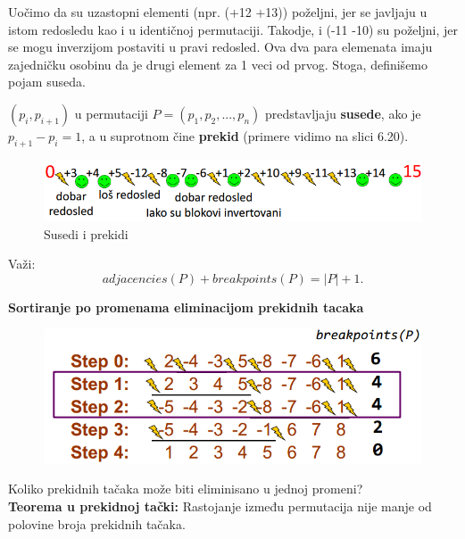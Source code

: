 \hspace{0.7cm}Uočimo da su uzastopni elementi (npr. (+12 +13)) poželjni, jer se javljaju u istom redosledu kao i u identičnoj permutaciji. Takodje, i (-11 -10) su poželjni, jer se mogu inverzijom postaviti u pravi redosled. Ova dva para elemenata imaju zajedničku osobinu da je drugi element za 1 veci od prvog. Stoga, definišemo pojam suseda.

\begin{definicija}{$(p_i, p_{i+1})$ u permutaciji $P = (p_1, p_2, ..., p_n)$ predstavljaju \textbf{susede}, ako je $p_{i+1} - p_i = 1$, a u suprotnom čine \textbf{prekid} (primere vidimo na slici 6.20).}
\end{definicija}

\begin{figure}[h!]
\centering
\includegraphics[scale=0.75]{poglavlja/6/slike/dobar_los.PNG}
\caption{Susedi i prekidi}
\label{slika:X}
\end{figure}

Važi:\\
$$ adjacencies(P) + breakpoints(P) = |P| + 1.$$

\hspace{1cm}

\large{\textbf{Sortiranje po promenama eliminacijom prekidnih tacaka}}\\

\begin{figure}[h]
\centering
\includegraphics[scale=0.7]{poglavlja/6/slike/koliko.PNG}
\caption{}
\label{slika:X}
\end{figure}

\noindent Koliko prekidnih tačaka može biti eliminisano u jednoj promeni?\\

\noindent \textbf{Teorema u prekidnoj tački: }Rastojanje između permutacija nije manje od polovine broja prekidnih tačaka.\\

